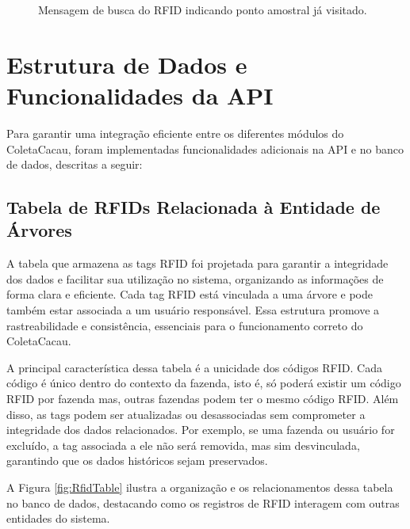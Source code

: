 \begin{figure}[H]
\begin{minipage}[b]{0.30\textwidth}
    \end{minipage}
    \caption{Mensagem de busca do RFID indicando ponto amostral já visitado.}
    \label{fig:RfidSamplingPointVisitedMessage}
\end{figure}

\section{Estrutura de Dados e Funcionalidades da API}
Para garantir uma integração eficiente entre os diferentes módulos do ColetaCacau, foram implementadas funcionalidades adicionais na API e no banco de dados, descritas a seguir:

\subsection{Tabela de RFIDs Relacionada à Entidade de Árvores}
A tabela que armazena as tags RFID foi projetada para garantir a integridade dos dados e facilitar sua utilização no sistema, organizando as informações de forma clara e eficiente. Cada tag RFID está vinculada a uma árvore e pode também estar associada a um usuário responsável. Essa estrutura promove a rastreabilidade e consistência, essenciais para o funcionamento correto do ColetaCacau.

A principal característica dessa tabela é a unicidade dos códigos RFID. Cada código é único dentro do contexto da fazenda, isto é, só poderá existir um código RFID por fazenda mas, outras fazendas podem ter o mesmo código RFID. Além disso, as tags podem ser atualizadas ou desassociadas sem comprometer a integridade dos dados relacionados. Por exemplo, se uma fazenda ou usuário for excluído, a tag associada a ele não será removida, mas sim desvinculada, garantindo que os dados históricos sejam preservados.

A Figura \ref{fig:RfidTable} ilustra a organização e os relacionamentos dessa tabela no banco de dados, destacando como os registros de RFID interagem com outras entidades do sistema.


